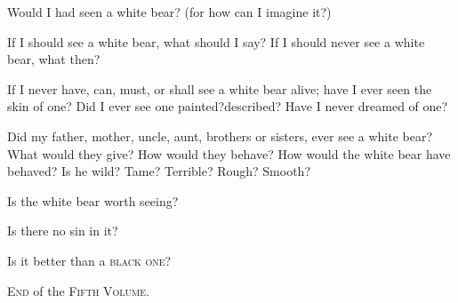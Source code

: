 \documentclass{article}
\begin{document}
Would I had seen a white bear? (for how can I imagine it?)

If I should see a white bear, what\break
should I say? If I should
never see a white bear, what then?

If I never have, can, must, or shall see a white bear alive;
have I ever seen the skin of one? Did I ever see one
painted?\tsk described? Have I never dreamed of one?

Did my father, mother, uncle, aunt, brothers or sisters, ever
see a white bear? What would they give? How would\break
they behave? How would the white\break
bear have behaved? Is he wild?\break
Tame? Terrible? Rough? Smooth?

\tsk Is the white bear worth seeing?\tsk

\tsk Is there no sin in it?\tsk

Is it better than a \textsc{black one}?

\vfill
\centerline{\textsc{End} of the \textsc{Fifth Volume}.}
\vfill
\end{document}
